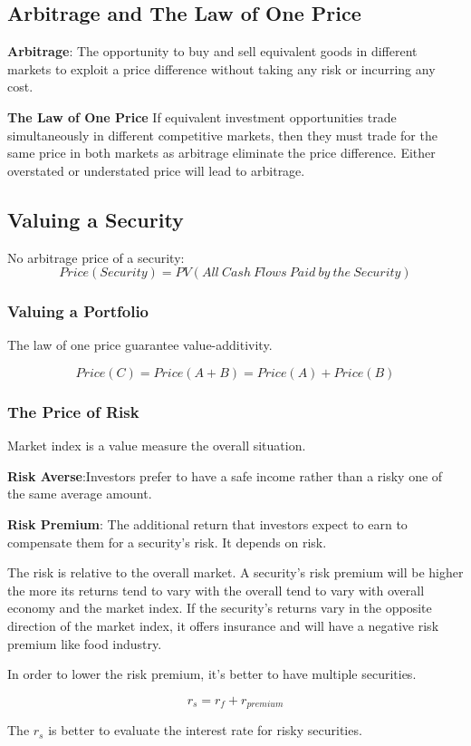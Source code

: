 \documentclass[10pt, a4paper]{article}
\begin{document}
        \subsection{Arbitrage and The Law of One Price}
            \textbf{Arbitrage}: The opportunity to buy and sell equivalent goods in different markets to exploit a price difference without taking any risk or incurring any cost. 

            \textbf{The Law of One Price}
                If equivalent investment opportunities trade simultaneously in different competitive markets, then they must trade for the same price in both markets as arbitrage eliminate the price difference.
                Either overstated or understated price will lead to arbitrage.
                
            \subsection{Valuing a Security}
                No arbitrage price of a security: 
                $$Price(Security) = PV(All\ Cash\ Flows\ Paid\ by\ the\ Security)$$

            \subsubsection{Valuing a Portfolio}
                The law of one price guarantee value-additivity.

                $$Price(C) = Price(A + B) = Price(A) + Price(B)$$

            \subsubsection{The Price of Risk}
                Market index is a value measure the overall situation. 

                \textbf{Risk Averse}:Investors prefer  to  have a safe income rather than a risky one of the same average amount. 

                \textbf{Risk Premium}: The additional return that investors expect to earn to compensate them for a security's risk. It depends on risk. 

                The risk is relative to the overall market.  A security's risk premium will be higher the more its returns tend to vary with the overall tend to vary with overall economy and the market index. If the security's returns vary in the opposite direction of the market index, it offers insurance and will have a negative risk premium like food industry.  

                In order to lower the risk premium, it's better to have multiple securities. 

                $$r_s = r_f + r_{premium}$$

                The $r_s$ is better to evaluate the interest rate for risky securities. 
\end{document}

